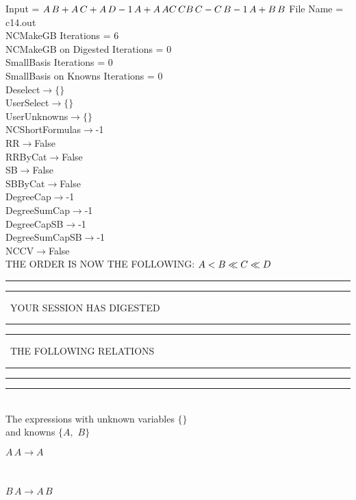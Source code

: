 \documentclass[rep10,leqno]{report}
\begin{document}
\normalsize
\baselineskip=12pt
\noindent
Input = 
$
\\A\,
 B + A\,
 C + A\,
 D\\
-1\,
 A + A\,
 A\\
C\,
 C\\
B\,
 C - C\,
 B\\
-1\,
 A + B\,
 B\\
$
File Name = c14.out\\
NCMakeGB Iterations = 6\\
NCMakeGB on Digested Iterations = 0\\
SmallBasis Iterations = 0\\
SmallBasis on Knowns Iterations = 0\\
Deselect$\rightarrow \{\}$\\
UserSelect$\rightarrow \{\}$\\
UserUnknowns$\rightarrow \{\}$\\
NCShortFormulas$\rightarrow$-1\\
RR$\rightarrow $False\\
RRByCat$\rightarrow $False\\
SB$\rightarrow $False\\
SBByCat$\rightarrow $False\\
DegreeCap$\rightarrow $-1\\
DegreeSumCap$\rightarrow $-1\\
DegreeCapSB$\rightarrow $-1\\
DegreeSumCapSB$\rightarrow $-1\\
NCCV$\rightarrow $False\\
THE ORDER IS NOW THE FOLLOWING:\hfil\break
$
A<B\ll
C\ll
D\\
$
\rule[2pt]{6in}{4pt}\hfil\break
\rule[2pt]{1.879in}{4pt}
\ YOUR SESSION HAS DIGESTED\ 
\rule[2pt]{1.879in}{4pt}\hfil\break
\rule[2pt]{1.923in}{4pt}
\ THE FOLLOWING RELATIONS\ 
\rule[2pt]{1.923in}{4pt}\hfil\break
\rule[2pt]{6in}{4pt}\hfil\break
\rule[3pt]{6in}{.7pt}\\
The expressions with unknown variables $\{\}$\\
and knowns $\{A,
$ $
B\}$\smallskip\\
\begin{minipage}{6in}
$
A\,
 A\rightarrow A
$
\end{minipage}\medskip \\
\begin{minipage}{6in}
$
B\,
 A\rightarrow A\,
 B
$
\end{minipage}\medskip \\
\end{document}
